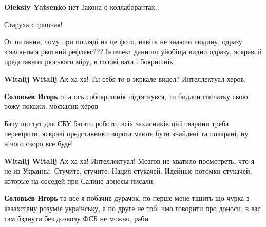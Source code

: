 \begin{itemize}
\begin{itemize}
\textbf{Oleksiy Yatsenko} нет Закона о коллаборантах...
\end{itemize}


Старуха страшная!



От питання, чому при погляді на це фото, навіть не знаючи людину, одразу
з'являеться рвотний рефлекс??? Інтелект данного уйобіща видно одразу, яскравий
представник рюського міру, в голові вата і бояришнік🤣🤣🤣

\begin{itemize}
\textbf{Witalij Witalij} Ах-ха-ха! Ты себя то в зкркале видел? Интеллектуал херов.


\textbf{Соловьёв Игорь} о, а ось собояришнік підтягнувся, ти бидлон спочатку свою рожу покажи, москалик херов🤣🤣🤣🤣🤣


Бачу що тут для СБУ багато роботи, всіх захисників цієї тварини треба перевірити, яскраві представники ворога мають бути знайдені та покарані, ну нічого скоро все буде!


\textbf{Witalij Witalij} Ах-ха-ха! Интеллектуал! Мозгов не хватило посмотреть, что я не из Украины. Стучите, стучите. Нация стукачей. Идейные потомки стукачей, которые на соседей при Салине доносы писали.


\textbf{Соловьёв Игорь} та все я побачив дурачок, по перше мене тішить що чурка з казахстану розуміє українську, а по друге не тобі чмо говорити про доноси, в вас там бзднути без дозволу ФСБ не можно, раби🤣🤣🤣🤣


\end{itemize}
\end{itemize}
